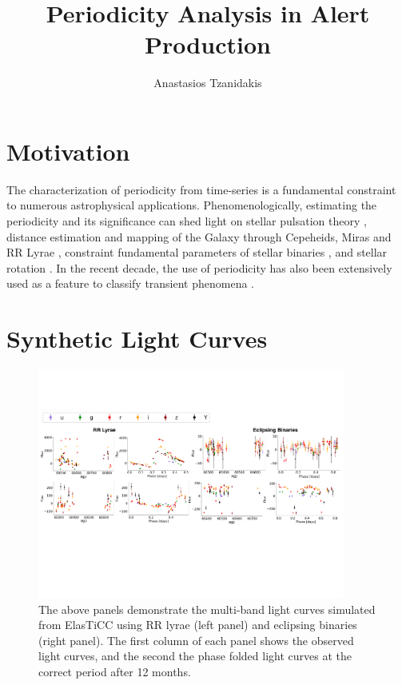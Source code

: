 \documentclass[DM,authoryear,toc]{lsstdoc}
\title{Periodicity Analysis in Alert Production}
\author{%
Anastasios Tzanidakis
}
\date{\vcsDate}
\begin{document}
\maketitle


\section{Motivation}
The characterization of periodicity from time-series is a fundamental constraint to numerous astrophysical applications. Phenomenologically, estimating the periodicity and its significance can shed light on stellar pulsation theory \citep{Antonello:Antonello81}, distance estimation and mapping of the Galaxy through Cepeheids, Miras and RR Lyrae \citep{Skowron:Skowron2019}, constraint fundamental parameters of stellar binaries \citep{Farinella:Farinella1979}, and stellar rotation \citep{Walkowicz:Walkowicz13}. In the recent decade, the use of periodicity has also been extensively used as a feature to classify transient phenomena \citep{Richards:R13}.



\section{Synthetic Light Curves}

\begin{figure}
  \includegraphics[width=0.9\textwidth]{figures/lightcurve_demo.pdf}
  \centering 
  \caption{The above panels demonstrate the multi-band light curves simulated from ElasTiCC using RR lyrae (left panel) and eclipsing binaries (right panel). The first column of each panel shows the observed light curves, and the second the phase folded light curves at the correct period after 12 months.}
  \label{fig:comp}
\end{figure}
\end{document}
